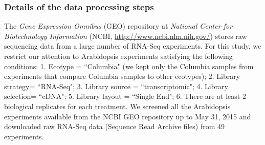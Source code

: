 \documentclass[letterpaper,12pt]{article}
\begin{document}
\subsubsection*{Details of the data processing steps}
The \textit{Gene Expression Omnibus} (GEO) repository at \textit{National
Center for Biotechnology Information} (NCBI,
\url{http://www.ncbi.nlm.nih.gov/}) stores raw sequencing data from a large
number of RNA-Seq experiments.  For this study, we restrict our attention to
Arabidopsis experiments satisfying the following conditions: 1.  Ecotype =
``Columbia" (we kept only the Columbia samples from experiments that compare
Columbia samples to other ecotypes); 2. Library strategy= ``RNA-Seq"; 3.
Library source = ``transcriptomic"; 4.  Library selection= ``cDNA"; 5.  Library
layout = ``Single End"; 6. There are at least 2 biological replicates for each
treatment. We screened all the Arabidopsis experiments available from the NCBI
GEO repository up to May 31, 2015 and downloaded raw RNA-Seq data (Sequence Read Archive files)
from 49 experiments. %
\end{document}
